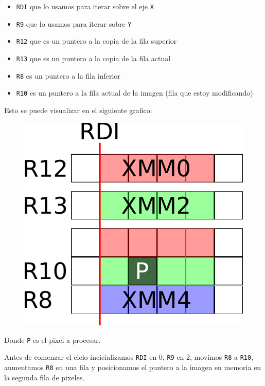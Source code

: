 \noindent
\begin{itemize}
\item \texttt{RDI} que lo usamos para iterar sobre el eje \texttt{X}
\item \texttt{R9} que lo usamos para iterar sobre \texttt{Y}
\item \texttt{R12} que es un puntero a la copia de la fila superior
\item \texttt{R13} que es un puntero a la copia de la fila actual
\item \texttt{R8} es un puntero a la fila inferior
\item \texttt{R10} es un puntero a la fila actual de la imagen (fila que estoy modificando)
\end{itemize}

Esto se puede visualizar en el siguiente grafico:

\begin{figure}[h!]
	\centering
	\includegraphics[scale=0.5]{images/BlurASM1_0}
\end{figure}

Donde \texttt{P} es el pixel a procesar.

Antes de comenzar el ciclo incicializamos \texttt{RDI} en 0, \texttt{R9} en 2, movimos \texttt{R8} a \texttt{R10}, aumentamos \texttt{R8} en una fila y posicionamos el puntero a la imagen en memoria en la segunda fila de pixeles.

